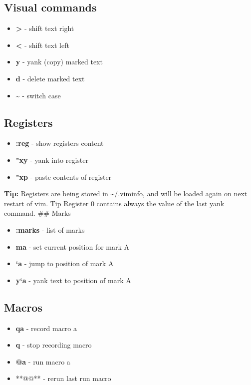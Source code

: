 \documentclass[landscape,twocolumn]{article}
\providecommand{\tightlist}{%
  \setlength{\itemsep}{0pt}\setlength{\parskip}{0pt}}
\begin{document}
\hypertarget{visual-commands}{%
\subsection{Visual commands}\label{visual-commands}}

\begin{itemize}
\tightlist
\item
  \textbf{\textgreater{}} - shift text right
\item
  \textbf{\textless{}} - shift text left
\item
  \textbf{y} - yank (copy) marked text
\item
  \textbf{d} - delete marked text
\item
  \textbf{\textasciitilde{}} - switch case
\end{itemize}

\hypertarget{registers}{%
\subsection{Registers}\label{registers}}

\begin{itemize}
\tightlist
\item
  \textbf{:reg} - show registers content
\item
  \textbf{"xy} - yank into register
\item
  \textbf{"xp} - paste contents of register
\end{itemize}

\textbf{Tip:} Registers are being stored in \textasciitilde/.viminfo,
and will be loaded again on next restart of vim. Tip Register 0 contains
always the value of the last yank command. \#\# Marks

\begin{itemize}
\tightlist
\item
  \textbf{:marks} - list of marks
\item
  \textbf{ma} - set current position for mark A
\item
  \textbf{`a} - jump to position of mark A
\item
  \textbf{y`a} - yank text to position of mark A
\end{itemize}

\hypertarget{macros}{%
\subsection{Macros}\label{macros}}

\begin{itemize}
\tightlist
\item
  \textbf{qa} - record macro a
\item
  \textbf{q} - stop recording macro
\item
  \textbf{@a} - run macro a
\item
  **@@** - rerun last run macro
\end{itemize}
\end{document}
